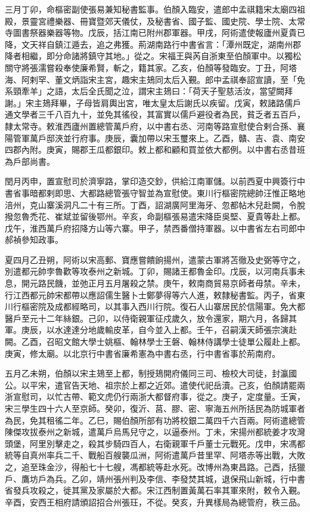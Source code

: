 \begin{pinyinscope}
 三月丁卯，命樞密副使張易兼知秘書監事。伯顏入臨安，遣郎中孟祺籍宋太廟四祖殿，景靈宮禮樂器、冊寶暨郊天儀仗，及秘書省、國子監、國史院、學士院、太常寺圖書祭器樂器等物。戊辰，括江南已附州郡軍器。甲戌，阿術遣使報廬州夏貴已降，文天祥自鎮江遁去，追之弗獲。荊湖南路行中書省言：「潭州既定，湖南州郡降者相繼，即分命諸將鎮守其地。」從之。宋福王與芮自浙東至伯顏軍中。以獨松關守將張濡嘗殺奉使廉希賢，斬之，籍其家。乙亥，伯顏等發臨安。丁丑，阿塔海、阿剌罕、董文炳詣宋主宮，趣宋主鳷同太后入覲。郎中孟祺奉詔宣讀，至「免系頸牽羊」之語，太后全氏聞之泣，謂宋主鳷曰：「荷天子聖慈活汝，當望闕拜謝。」宋主鳷拜畢，子母皆肩輿出宮，唯太皇太后謝氏以疾留。戊寅，敕諸路儒戶通文學者三千八百九十，並免其徭役，其富實以儒戶避役者為民，貧乏者五百戶，隸太常寺。敕淮西廬州置總管萬戶府，以中書右丞、河南等路宣慰使合剌合孫、襄陽管軍萬戶邸浹並行府事。庚辰，囊加帶以宋玉璽來上。乙酉，贛、吉、袁、南安四郡內附。庚寅，賜郡王瓜都銀印。敕上都和顧和買並依大都例。以中書右丞昔班為戶部尚書。



 閏月丙申，置宣慰司於濟寧路，掌印造交鈔，供給江南軍儲。以前西夏中興簽行中書省事暗都剌即思、大都路總管張守智並為宣慰使。東川行樞密院總帥汪惟正略地涪州，克山寨溪洞凡二十有三所。丁酉，詔湖廣阿里海牙、忽都帖木兒赴闕，令脫撥忽魯禿花、崔斌並留後鄂州。辛亥，命副樞張易遣宋降臣吳堅、夏貴等赴上都。戊午，淮西萬戶府招降方山等六寨。甲子，禁西番僧持軍器。以中書省左右司郎中郝禎參知政事。



 夏四月乙丑朔，阿術以宋高郵、寶應嘗饋餉揚州，遣蒙古軍將苫徹及史弼等守之，別遣都元帥孛魯歡等攻泰州之新城。丁卯，賜諸王都魯金印。戊辰，以河南兵事未息，開元路民饑，並弛正月五月屠殺之禁。庚午，敕南商貿易京師者毋禁。辛未，行江西都元帥宋都帶以應詔儒生醫卜士鄭夢得等六人進，敕隸秘書監。丙子，省東川行樞密院及成都經略司，以其事入西川行院。復石人山寨居民於信陽軍。免大都醫戶至元十二年絲銀。己卯，以侍衛親軍征戍歲久，放令還家，期六月，各歸其軍。庚辰，以水達達分地歲輸皮革，自今並入上都。壬午，召嗣漢天師張宗演赴闕。乙酉，召昭文館大學士姚樞、翰林學士王磐、翰林侍講學士徒單公履赴上都。庚寅，修太廟。以北京行中書省廉希憲為中書右丞，行中書省事於荊南府。



 五月乙未朔，伯顏以宋主鳷至上都，制授鳷開府儀同三司、檢校大司徒，封瀛國公。以平宋，遣官告天地、祖宗於上都之近郊。遣使代祀岳瀆。己亥，伯顏請罷兩浙宣慰司，以忙古帶、範文虎仍行兩浙大都督府事，從之。庚子，定度量。壬寅，宋三學生四十六人至京師。癸卯，復沂、莒、膠、密、寧海五州所括民為防城軍者為民，免其租徭二年。乙巳，賜伯顏所部有功將校銀二萬四千六百兩。阿術遣總管陳傑攻拔泰州之新城，遣萬戶烏馬兒守之，以逼泰州。丁未，宋揚州都統姜才攻灣頭堡，阿里別擊走之，殺其步騎四百人，右衛親軍千戶董士元戰死。戊申，宋馮都統等自真州率兵二千、戰船百艘襲瓜洲，阿術遣萬戶昔里罕、阿塔赤等出戰，大敗之，追至珠金沙，得船七十七艘，馮都統等赴水死。改博州為東昌路。己酉，括獵戶、鷹坊戶為兵。乙卯，靖州張州判及李信、李發焚其城，退保飛山新城，行中書省發兵攻殺之，徙其黨及家屬於大都。宋江西制置黃萬石率其軍來附，敕令入覲。辛酉，安西王相府請頒詔招合州張玨，不從。癸亥，升異樣局為總管府，秩三品。




\end{pinyinscope}
